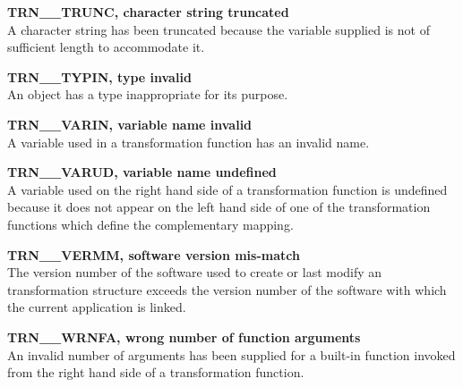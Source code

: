 \begin{description}
\item {\bf TRN\_\_TRUNC, character string truncated}\\
A character string has been truncated because the  variable
supplied is not of sufficient length to accommodate it. 

\item {\bf TRN\_\_TYPIN, type invalid}\\
An  object has a type inappropriate for its purpose.

\item {\bf TRN\_\_VARIN, variable name invalid}\\
A variable used in a transformation function has an invalid name.

\item {\bf TRN\_\_VARUD, variable name undefined}\\
A variable used on the right hand side of a transformation function is
undefined because it does not appear on the left hand side of one of the
transformation functions which define the complementary mapping. 

\item {\bf TRN\_\_VERMM, software version mis-match}\\
The version number of the  software used to create or last
modify an  transformation structure exceeds the version number of
the software with which the current application is linked. 

\item {\bf TRN\_\_WRNFA, wrong number of function arguments}\\
An invalid number of arguments has been supplied for a built-in function
invoked from the right hand side of a transformation function. 

\end{description}


